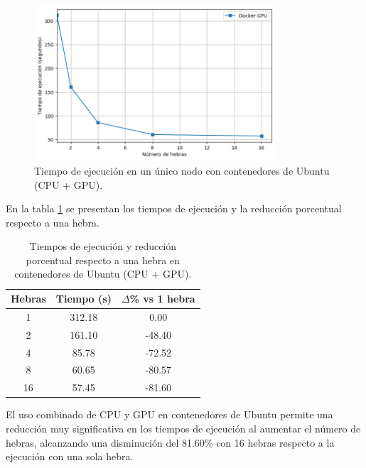 \begin{figure}[H]
    \centering
    \includegraphics[width=0.8\textwidth]{imagenes/cap5/single-node_ubuntu_docker_gpu_time.png}
    \caption{Tiempo de ejecución en un único nodo con contenedores de Ubuntu (CPU + GPU).}
    \label{fig:single-node_ubuntu_docker_gpu_time}
\end{figure}

En la tabla \ref{tab:single-node_ubuntu_docker_gpu} se presentan los tiempos de ejecución y la reducción porcentual respecto a una hebra.

\begin{table}[ht]
    \centering
    \begin{tabular}{|c|c|c|}
        \hline
        \textbf{Hebras} & \textbf{Tiempo (s)} & \textbf{$\Delta$\% vs 1 hebra} \\
        \hline
        1               & 312.18              & 0.00                           \\
        2               & 161.10              & -48.40                         \\
        4               & 85.78               & -72.52                         \\
        8               & 60.65               & -80.57                         \\
        16              & 57.45               & -81.60                         \\
        \hline
    \end{tabular}
    \caption{Tiempos de ejecución y reducción porcentual respecto a una hebra en contenedores de Ubuntu (CPU + GPU).}
    \label{tab:single-node_ubuntu_docker_gpu}
\end{table}

El uso combinado de CPU y GPU en contenedores de Ubuntu permite una reducción muy significativa en los tiempos de ejecución al aumentar el número de hebras, alcanzando una disminución del 81.60\% con 16 hebras respecto a la ejecución con una sola hebra.

